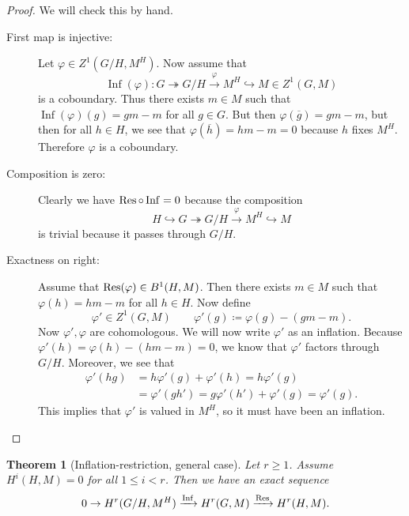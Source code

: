 \documentclass[leqno, openany]{memoir}
\newtheorem{thm}{Theorem}[section]
\theoremstyle{definition}
\theoremstyle{remark}
\theoremstyle{plain}
\theoremstyle{definition}
\theoremstyle{remark}
\newcommand{\ol}[1]{\overline{#1}}
\DeclareMathOperator{\Inf}{Inf}
\begin{document}
\begin{proof} We will check this by hand.  \begin{description} \item[First map
    is injective:] Let $\varphi \in Z^1(G/H, M^H)$. Now assume that \[
    \Inf(\varphi) \colon G \twoheadrightarrow G/H \xrightarrow{\varphi} M^H
\hookrightarrow M \in Z^1(G, M)\]  is a coboundary. Thus there exists $m \in M$
such that $\Inf(\varphi) (g) = gm - m$ for all $g \in G$. But then
$\varphi(\ol{g}) = gm - m$, but then for all $h \in H$, we see that
$\varphi(\ol{h}) = hm-m = 0$ because $h$ fixes $M^H$. Therefore $\varphi$ is a
coboundary.  \item[Composition is zero:] Clearly we have $\Res \circ \Inf = 0$
because the composition \[ H \hookrightarrow G \twoheadrightarrow{G/H}
\xrightarrow{\varphi} M^H \hookrightarrow M \] is trivial because it passes
through $G/H$.  \item[Exactness on right:] Assume that $\Res(\varphi) \in
B^1(H, M)$. Then there exists $m \in M$ such that $\varphi(h) = hm - m$ for all
$h \in H$. Now define \[ \varphi' \in Z^1(G, M) \qquad \varphi'(g) \coloneqq
\varphi(g) - (gm-m). \] Now $\varphi', \varphi$ are cohomologous. We will now
write $\varphi'$ as an inflation. Because $\varphi'(h) = \varphi(h) - (hm-m) =
0$, we know that $\varphi'$ factors through $G/H$. Moreover, we see that
\begin{align*} \varphi'(hg) &= h \varphi'(g) + \varphi'(h) = h \varphi'(g) \\
&= \varphi'(gh') = g \varphi'(h') + \varphi'(g) = \varphi'(g).  \end{align*}
This implies that $\varphi'$ is valued in $M^H$, so it must have been an
inflation. \qedhere \end{description} \end{proof}

\begin{thm}[Inflation-restriction, general case] Let $r \geq 1$. Assume $H^i(H,
    M) = 0$ for all $1 \leq i < r$. Then we have an exact sequence \[ 0 \to
    H^r(G/H, M^H) \xrightarrow{\Inf} H^r(G, M) \xrightarrow{\Res} H^r(H, M). \]
\end{thm}
\end{document}
